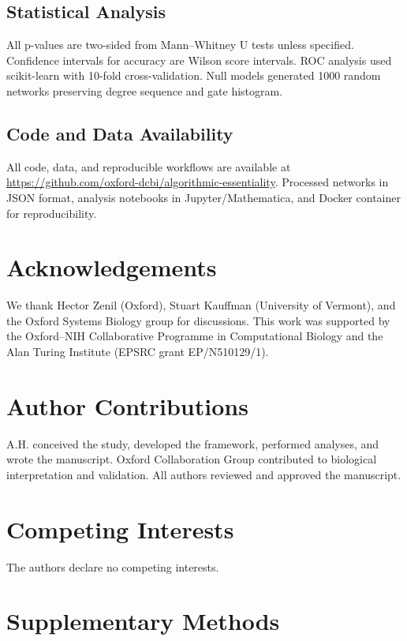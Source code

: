 \documentclass[12pt]{article}
\begin{document}
\subsection{Statistical Analysis}
All p-values are two-sided from Mann–Whitney U tests unless specified. Confidence intervals for accuracy are Wilson score intervals. ROC analysis used scikit-learn with 10-fold cross-validation. Null models generated 1000 random networks preserving degree sequence and gate histogram.

\subsection{Code and Data Availability}
All code, data, and reproducible workflows are available at \url{https://github.com/oxford-dcbi/algorithmic-essentiality}. Processed networks in JSON format, analysis notebooks in Jupyter/Mathematica, and Docker container for reproducibility.

\section*{Acknowledgements}
We thank Hector Zenil (Oxford), Stuart Kauffman (University of Vermont), and the Oxford Systems Biology group for discussions. This work was supported by the Oxford–NIH Collaborative Programme in Computational Biology and the Alan Turing Institute (EPSRC grant EP/N510129/1).

\section*{Author Contributions}
A.H. conceived the study, developed the framework, performed analyses, and wrote the manuscript. Oxford Collaboration Group contributed to biological interpretation and validation. All authors reviewed and approved the manuscript.

\section*{Competing Interests}
The authors declare no competing interests.

\printbibliography

\newpage
\section{Supplementary Methods}
\end{document}
